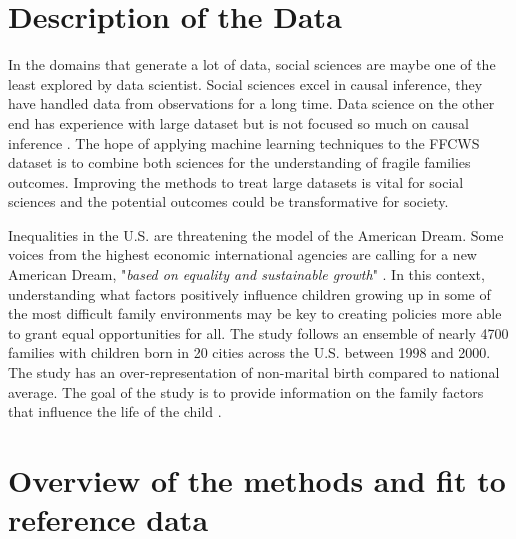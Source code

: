 \documentclass{article} %
\begin{document}
\section{Description of the Data}
In the domains that generate a lot of data, social sciences are maybe one of the least explored by data scientist. Social sciences excel in causal inference, they have handled data from observations for a long time. Data science on the other end has experience with large dataset but is not focused so much on causal inference \cite{grimmer2015we}. The hope of applying machine learning techniques to the FFCWS dataset is to combine both sciences for the understanding of fragile families outcomes. Improving the methods to treat large datasets is vital for social sciences and the potential outcomes could be transformative for society.

Inequalities in the U.S. are threatening the model of the American Dream. Some voices from the highest economic international agencies are calling for a new American Dream, "\textit{based on equality and sustainable growth}" \cite{wef2017}. In this context, understanding what factors positively influence children growing up in some of the most difficult family environments may be key to creating policies more able to grant equal opportunities for all. The study follows an ensemble of nearly 4700 families with children born in 20 cities across the U.S. between 1998 and 2000. The study has an over-representation of non-marital birth compared to national average. The goal of the study is to provide information on the family factors that influence the life of the child  \cite{reichman2001fragile}.


\section{Overview of the methods and fit to reference data}
\end{document}
